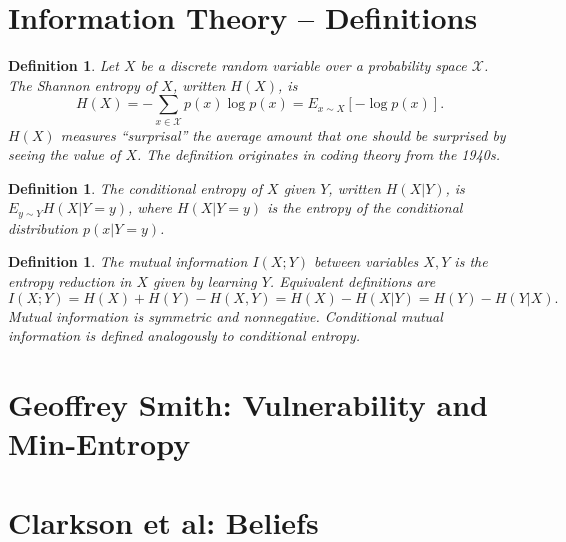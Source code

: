 \documentclass[10pt]{amsart}
\newtheorem{defn}[thm]{Definition}
\begin{document}
\section{Information Theory -- Definitions}
\begin{defn} Let $X$ be a discrete random variable over a probability space $\mathcal X$. The
  Shannon entropy of $X$, written $H(X)$, is
  \[
    H(X) = -\sum_{x \in \mathcal X} p(x) \log p(x) = E_{x \sim X}[-\log p(x)].
  \]
  $H(X)$ measures ``surprisal'' the average amount that one should be surprised
  by seeing the value of $X$. The definition originates in coding theory from
  the 1940s.
\end{defn}
\begin{defn}
  The conditional entropy of $X$ given $Y$, written $H(X|Y)$, is $E_{y \sim Y} H(X|Y = y)$,
  where $H(X | Y = y)$ is the entropy of the conditional distribution $p(x | Y = y)$.
\end{defn}
\begin{defn}
  The mutual information $I(X ; Y)$ between variables $X,Y$ is the entropy
  reduction in $X$ given by learning $Y$. Equivalent definitions are
  \[
    I(X;Y) = H(X) + H(Y) - H(X,Y) = H(X) - H(X | Y) = H(Y) - H(Y | X).
  \]
  Mutual information is symmetric and nonnegative. Conditional mutual information is
  defined analogously to conditional entropy.
\end{defn}



\section{Geoffrey Smith: Vulnerability and Min-Entropy}

\section{Clarkson et al: Beliefs}
\end{document}
